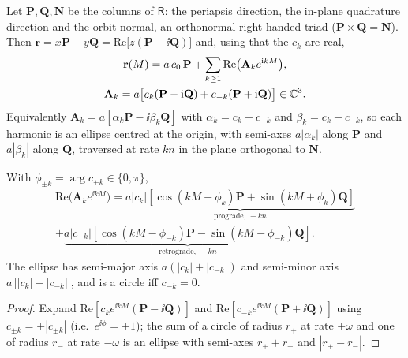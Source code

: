 Let $\mathbf P,\mathbf Q,\mathbf N$ be the columns of $\mathsf R$:
the periapsis direction, the in-plane quadrature direction and the orbit
normal, an orthonormal right-handed triad ($\mathbf P\times\mathbf Q=\mathbf N$).
Then $\mathbf r=x\mathbf P+y\mathbf Q=\mathrm{Re}\big[z(\mathbf P-\ii\mathbf Q)\big]$
and, using that the $c_k$ are real,
\begin{gather}
\mathbf r(M)=a\,c_0\,\mathbf P+\sum_{k\ge1}\mathrm{Re}\big(\mathbf A_ke^{\mathrm{i} kM}\big),\notag\\
\mathbf A_k=a\big[c_k(\mathbf P-\mathrm{i}\mathbf Q)+c_{-k}(\mathbf P+\mathrm{i}\mathbf Q)\big]\in\mathbb C^3 .
\label{eq:vecterm}
\end{gather}
Equivalently $\mathbf A_k=a[\alpha_k\mathbf P-\ii\beta_k\mathbf Q]$ with
$\alpha_k=c_k+c_{-k}$ and $\beta_k=c_k-c_{-k}$, so each harmonic is an ellipse
centred at the origin, with semi-axes $a|\alpha_k|$ along $\mathbf P$ and
$a|\beta_k|$ along $\mathbf Q$, traversed at rate $kn$ in the plane
orthogonal to $\mathbf N$.

\begin{proposition}
\label{prop:twocircles}
With $\phi_{\pm k}=\arg c_{\pm k}\in\{0,\pi\}$,
\begin{multline}
\mathrm{Re}\big(\mathbf A_ke^{\ii kM}\big)=
\underbrace{a|c_k|[\cos(kM{+}\phi_k)\mathbf P+\sin(kM{+}\phi_k)\mathbf Q]}_{\text{prograde, }+kn}\\
+\underbrace{a|c_{-k}|[\cos(kM{-}\phi_{-k})\mathbf P-\sin(kM{-}\phi_{-k})\mathbf Q]}_{\text{retrograde, }-kn}.
\label{eq:twocircles}
\end{multline}
The ellipse has semi-major axis $a(|c_k|+|c_{-k}|)$ and semi-minor axis
$a\,\big||c_k|-|c_{-k}|\big|$, and is a circle iff $c_{-k}=0$.
\end{proposition}
\begin{proof}
Expand $\mathrm{Re}[c_ke^{\ii kM}(\mathbf P-\ii\mathbf Q)]$ and
$\mathrm{Re}[c_{-k}e^{\ii kM}(\mathbf P+\ii\mathbf Q)]$ using
$c_{\pm k}=\pm|c_{\pm k}|$ (i.e.\ $e^{\ii\phi}=\pm1$); the sum of a circle of
radius $r_+$ at rate $+\omega$ and one of radius $r_-$ at rate $-\omega$
is an ellipse with semi-axes $r_++r_-$ and $|r_+-r_-|$.
\end{proof}

